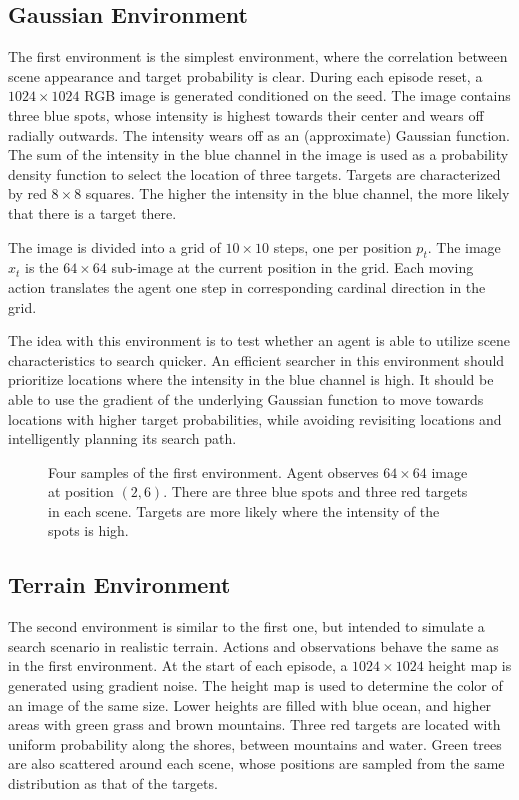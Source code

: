 \subsection{Gaussian Environment}

The first environment is the simplest environment, where the correlation between scene appearance and target probability is clear.
During each episode reset, a \(1024 \times 1024\) RGB image is generated conditioned on the seed.
The image contains three blue spots, whose intensity is highest towards their center and wears off radially outwards.
The intensity wears off as an (approximate) Gaussian function.
The sum of the intensity in the blue channel in the image is used as a probability density function to select the location of three targets.
Targets are characterized by red \(8 \times 8\) squares.
The higher the intensity in the blue channel, the more likely that there is a target there.

The image is divided into a grid of \(10 \times 10\) steps, one per position \(p_t\).
The image \(x_t\) is the \(64 \times 64\) sub-image at the current position in the grid.
Each moving action translates the agent one step in corresponding cardinal direction in the grid.

The idea with this environment is to test whether an agent is able to utilize scene characteristics to search quicker.
An efficient searcher in this environment should prioritize locations where the intensity in the blue channel is high.
It should be able to use the gradient of the underlying Gaussian function to move towards locations with higher target probabilities, while avoiding revisiting locations and intelligently planning its search path.

\begin{figure}
    \centering
    
    \caption[Gaussian environment]{Four samples of the first environment. Agent observes \(64 \times 64\) image at position \((2, 6)\). There are three blue spots and three red targets in each scene. Targets are more likely where the intensity of the spots is high.}
    \label{fig:gaussian}
\end{figure}

\subsection{Terrain Environment}

The second environment is similar to the first one, but intended to simulate a search scenario in realistic terrain.
Actions and observations behave the same as in the first environment.
At the start of each episode, a \(1024 \times 1024\) height map is generated using gradient noise.
The height map is used to determine the color of an image of the same size.
Lower heights are filled with blue ocean, and higher areas with green grass and brown mountains.
Three red targets are located with uniform probability along the shores, between mountains and water.
Green trees are also scattered around each scene, whose positions are sampled from the same distribution as that of the targets.

